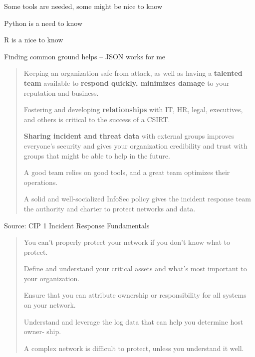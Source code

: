 \documentclass[Screen16to9,17pt]{foils}
\begin{document}
\begin{list2}
\item Some tools are needed, some might be nice to know
\item Python is a need to know
\item R is a nice to know
\item Finding common ground helps -- JSON works for me
\end{list2}




\begin{quote}
\begin{list2}
\item Keeping an organization safe from attack, as well as having a {\bf talented team} available to {\bf respond quickly, minimizes damage} to your reputation and business.
\item Fostering and developing {\bf relationships} with IT, HR, legal, executives, and others is critical to the success of a CSIRT.
\item {\bf Sharing incident and threat data} with external groups improves everyone’s security and gives your organization credibility and trust with groups that might be able to help in the future.
\item A good team relies on good tools, and a great team optimizes their operations.
\item A solid and well-socialized InfoSec policy gives the incident response team the authority and charter to protect networks and data.
\end{list2}
\end{quote}
Source: CIP 1 Incident Response Fundamentals



\begin{quote}
\begin{list2}
\item You can’t properly protect your network if you don’t know what to protect.
\item Define and understand your critical assets and what’s most important to your
  organization.
\item Ensure that you can attribute ownership or responsibility for all systems on your
  network.
\item Understand and leverage the log data that can help you determine host owner‐
  ship.
\item A complex network is difficult to protect, unless you understand it well.
\end{list2}
\end{quote}
\end{document}
